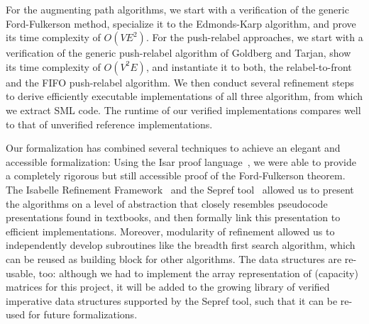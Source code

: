 \documentclass[smallcondensed]{svjour3}     %
\begin{document}
  For the augmenting path algorithms, we start with a verification of the generic Ford-Fulkerson method, 
  specialize it to the Edmonds-Karp algorithm, and prove its time complexity of $O(VE^2)$.
  For the push-relabel approaches, we start with a verification of the generic push-relabel algorithm of Goldberg and Tarjan, show its time complexity of $O(V^2E)$, and
  instantiate it to both, the relabel-to-front and the FIFO push-relabel algorithm.
  We then conduct several refinement steps to derive efficiently executable implementations of all three algorithm, from which we extract SML code.
  The runtime of our verified implementations compares well to that of unverified reference implementations.
  
  Our formalization has combined several techniques to achieve an elegant and accessible formalization: 
  Using the Isar proof language~\cite{Wenzel99}, we were able to provide a completely rigorous but 
  still accessible proof of the Ford-Fulkerson theorem. The Isabelle Refinement Framework~\cite{LaTu12,La12} and the Sepref tool~\cite{La15,La16}
  allowed us to present the algorithms on a level 
  of abstraction that closely resembles pseudocode presentations found in textbooks, and then formally link this presentation to efficient
  implementations. Moreover, modularity of refinement allowed us to independently develop subroutines like the breadth first search algorithm, 
  which can be reused as building block for other algorithms.
  The data structures are re-usable, too: although we had to implement the array representation of (capacity) matrices for this project, it will be added to the growing library of verified imperative data structures 
  supported by the Sepref tool, such that it can be re-used for future formalizations.
  
\end{document}
